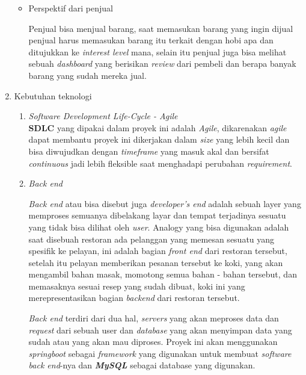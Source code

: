 \documentclass[a4paper]{article}
\begin{document}
\begin{enumerate}[label=\alph*. ]
\begin{itemize}
              \item Perspektif dari penjual

                    Penjual bisa menjual barang, saat memasukan barang yang ingin dijual penjual harus memasukan barang itu terkait dengan hobi apa dan ditujukkan ke \textit{interest level} mana, selain itu penjual juga bisa melihat sebuah \textit{dashboard} yang berisikan \textit{review} dari pembeli dan berapa banyak barang yang sudah mereka jual.
          \end{itemize}


    \item Kebutuhan teknologi

          \begin{enumerate}
              \item \textit{Software Development Life-Cycle - Agile}\\
                \textbf{SDLC} yang dipakai dalam proyek ini adalah \textit{Agile}, dikarenakan \textit{agile} dapat membantu proyek ini dikerjakan dalam \textit{size} yang lebih kecil dan bisa diwujudkan dengan \textit{timeframe} yang masuk akal dan bersifat \textit{continuous} jadi lebih fleksible saat menghadapi perubahan \textit{requirement}\autocite{atlassian-agile}.

              \item \textit{Back end}

                    \textit{Back end} atau bisa disebut juga \textit{developer's end} adalah sebuah layer yang memproses semuanya dibelakang layar dan tempat terjadinya sesuatu yang tidak bisa dilihat oleh \textit{user}\autocite{letsgodojo-frontend-backend}. Analogy yang bisa digunakan adalah saat disebuah restoran ada pelanggan yang memesan sesuatu yang spesifik ke pelayan, ini adalah bagian \textit{front end} dari restoran tersebut, setelah itu pelayan memberikan pesanan tersebut ke koki, yang akan mengambil bahan masak, momotong semua bahan - bahan tersebut, dan memasaknya sesuai resep yang sudah dibuat, koki ini yang merepresentasikan bagian \textit{backend} dari restoran tersebut\autocite{codecademy-backend}.

                    \textit{Back end} terdiri dari dua hal, \textit{servers} yang akan meproses data dan \textit{request} dari sebuah user dan \textit{database} yang akan menyimpan data yang sudah atau yang akan mau diproses\autocite{codecademy-backend}. Proyek ini akan menggunakan \textit{springboot} sebagai \textit{framework} yang digunakan untuk membuat \textit{software back end}-nya dan \textit{\textbf{MySQL}} sebagai database yang digunakan.


\end{enumerate}
\end{enumerate}
\end{document}
